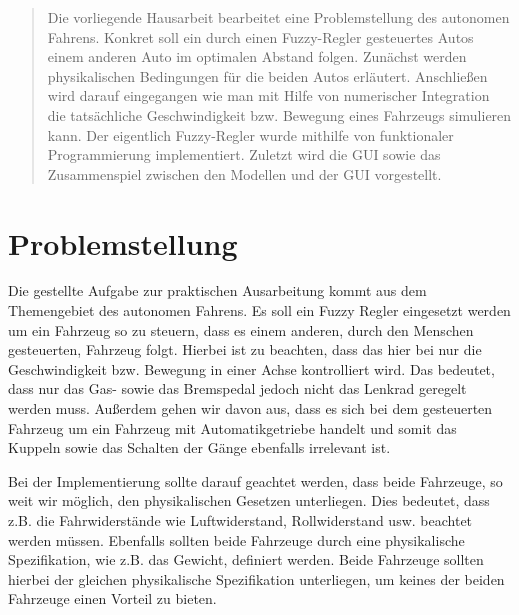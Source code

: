 \documentclass[12pt,a4paper,bibliography=totocnumbered,listof=totocnumbered, abstracton]{scrartcl}
\theoremstyle{Umgebung}
\begin{document}
\newtheorem{bsp}{Beispiel}
\newtheorem{defnt}{Definition}

\begin{abstract} 
	Die vorliegende Hausarbeit bearbeitet eine Problemstellung des autonomen Fahrens. Konkret soll ein durch einen Fuzzy-Regler gesteuertes Autos einem anderen Auto im optimalen Abstand folgen. Zunächst werden physikalischen Bedingungen für die beiden Autos erläutert. Anschließen wird darauf eingegangen wie man mit Hilfe von numerischer Integration die tatsächliche Geschwindigkeit bzw. Bewegung eines Fahrzeugs simulieren kann. Der eigentlich Fuzzy-Regler wurde mithilfe von funktionaler Programmierung implementiert. Zuletzt wird die GUI sowie das Zusammenspiel zwischen den Modellen und der GUI vorgestellt.

\end{abstract} 
\newpage

\section{Problemstellung}

Die gestellte Aufgabe zur praktischen Ausarbeitung kommt aus dem Themengebiet des autonomen Fahrens. Es soll ein Fuzzy Regler eingesetzt werden um ein Fahrzeug so zu steuern, dass es einem anderen, durch den Menschen gesteuerten, Fahrzeug folgt.  Hierbei ist zu beachten, dass das hier bei nur die Geschwindigkeit bzw. Bewegung in einer Achse kontrolliert wird. Das bedeutet, dass nur das Gas- sowie das Bremspedal jedoch nicht das Lenkrad geregelt werden muss. Außerdem gehen wir davon aus, dass es sich bei dem gesteuerten Fahrzeug um ein Fahrzeug mit Automatikgetriebe handelt und somit das Kuppeln sowie das Schalten der Gänge ebenfalls irrelevant ist. 

Bei der Implementierung sollte darauf geachtet werden, dass beide Fahrzeuge, so weit wir möglich, den physikalischen Gesetzen unterliegen. Dies bedeutet, dass z.B. die Fahrwiderstände wie Luftwiderstand, Rollwiderstand usw. beachtet werden müssen. Ebenfalls sollten beide Fahrzeuge durch eine physikalische Spezifikation, wie z.B. das Gewicht, definiert werden. Beide Fahrzeuge sollten hierbei der gleichen physikalische Spezifikation unterliegen, um keines der beiden Fahrzeuge einen Vorteil zu bieten.
\end{document}

